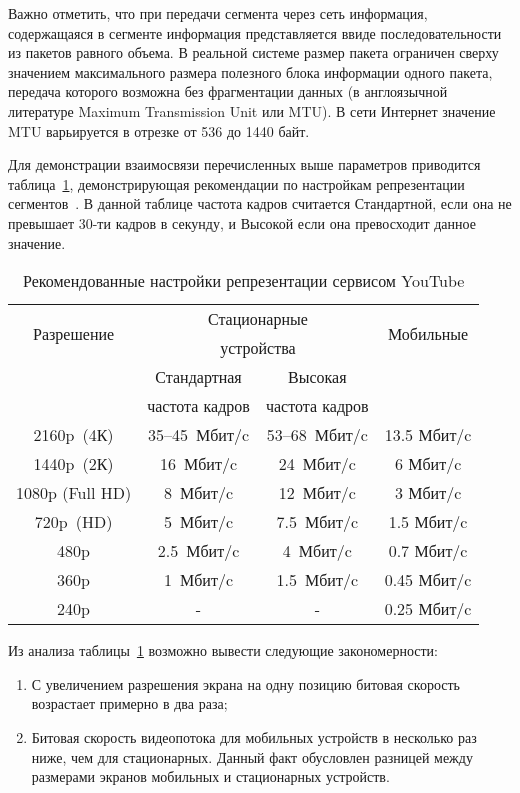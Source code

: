 Важно отметить, что при передачи сегмента через сеть информация, содержащаяся в сегменте информация представляется ввиде последовательности из пакетов равного объема. В реальной системе размер пакета ограничен сверху значением максимального размера полезного блока информации одного пакета, передача которого возможна без фрагментации данных (в англоязычной литературе Maximum Transmission Unit или MTU). В сети Интернет значение MTU варьируется в отрезке от 536 до 1440 байт.

Для демонстрации взаимосвязи перечисленных выше параметров приводится таблица~\ref{tab:youtubeBr}, демонстрирующая рекомендации по настройкам репрезентации сегментов~\cite{YouTubeBR,HuaweiReport}. В данной таблице частота кадров считается Стандартной, если она не превышает 30-ти кадров в секунду, и Высокой если она превосходит данное значение.

\begin{table}[!h]
    \caption{Рекомендованные настройки репрезентации сервисом YouTube}
    \begin{center}
		\label{tab:youtubeBr}
	    \begin{tabular}{|c|c|c|c|}
		\hline
		\multirow{2}{*}{Разрешение} & \multicolumn{2}{c|}{Стационарные} & \multirow{2}{*}{Мобильные} \\
		 & \multicolumn{2}{c|}{устройства} & \multirow{2}{*}{устройства} \\
		\cline{2-3}
		 & Стандартная & Высокая & \\
		 & частота кадров & частота кадров & \\
		\hline
		2160p (4К) & 35–45 Мбит/c & 53–68 Мбит/c & 13.5 Мбит/c \\
		\hline
		1440p (2К) & 16 Мбит/c & 24 Мбит/c & 6 Мбит/c \\
		\hline
		1080p (Full HD) & 8 Мбит/c & 12 Мбит/c & 3 Мбит/c \\
		\hline
		720p (HD) & 5 Мбит/c & 7.5 Мбит/c & 1.5 Мбит/c \\
		\hline
		480p & 2.5 Мбит/c & 4 Мбит/c & 0.7 Мбит/c \\
		\hline
		360p & 1 Мбит/c & 1.5 Мбит/c & 0.45 Мбит/c \\
		\hline
		240p & - & - & 0.25 Мбит/c \\
		\hline
		\end{tabular}
	\end{center}
\end{table}

Из анализа таблицы~\ref{tab:youtubeBr} возможно вывести следующие закономерности:
\begin{enumerate}
  \item С увеличением разрешения экрана на одну позицию битовая скорость возрастает примерно в два раза;
  \item Битовая скорость видеопотока для мобильных устройств в несколько раз ниже, чем для стационарных. Данный факт обусловлен разницей между размерами экранов мобильных и стационарных устройств.
\end{enumerate}

